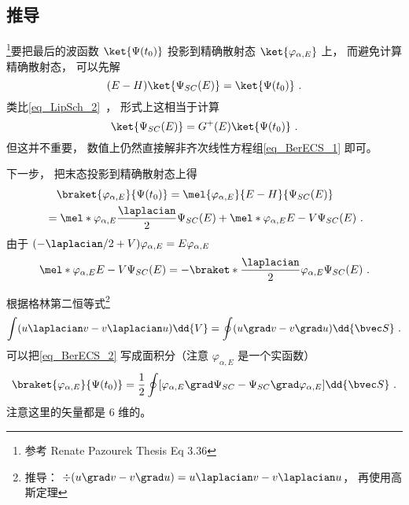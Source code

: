 
\begin{issues}
\issueDraft
\end{issues}


\subsection{推导}
\footnote{参考 Renate Pazourek Thesis Eq 3.36}要把最后的波函数 $\ket{\Psi(t_0)}$ 投影到精确散射态 $\ket{\varphi_{\alpha,E}}$ 上， 而避免计算精确散射态， 可以先解
\begin{equation}\label{eq_BerECS_1}
(E-H)\ket{\Psi_{SC}(E)} = \ket{\Psi(t_0)}~.
\end{equation}
类比\autoref{eq_LipSch_2}~， 形式上这相当于计算
\begin{equation}
\ket{\Psi_{SC}(E)} = G^+(E)\ket{\Psi(t_0)}~.
\end{equation}
但这并不重要， 数值上仍然直接解非齐次线性方程组\autoref{eq_BerECS_1} 即可。

下一步， 把末态投影到精确散射态上得
\begin{equation}\label{eq_BerECS_2}
\begin{aligned}
&\quad \braket{\varphi_{\alpha,E}}{\Psi(t_0)} = \mel{\varphi_{\alpha,E}}{E-H}{\Psi_{SC}(E)}\\
&= \mel*{\varphi_{\alpha,E}}{\frac{\laplacian}{2}}{\Psi_{SC}(E)} + \mel*{\varphi_{\alpha,E}}{E-V}{\Psi_{SC}(E)}~.
\end{aligned}
\end{equation}
由于 $(-\laplacian/2+V)\varphi_{\alpha,E} = E\varphi_{\alpha,E}$
\begin{equation}
\mel*{\varphi_{\alpha,E}}{E-V}{\Psi_{SC}(E)} = -\braket*{\frac{\laplacian}{2} \varphi_{\alpha,E}}{\Psi_{SC}(E)}~.
\end{equation}


根据格林第二恒等式\footnote{推导： $\div(u\grad v - v\grad u) = u\laplacian v - v\laplacian u$， 再使用高斯定理}
\begin{equation}
\int (u\laplacian v - v\laplacian u)\dd{V} = \oint (u\grad v - v\grad u) \dd{\bvec S}~.
\end{equation}
可以把\autoref{eq_BerECS_2} 写成面积分（注意 $\varphi_{\alpha,E}$ 是一个实函数）
\begin{equation}\label{eq_BerECS_3}
\braket{\varphi_{\alpha,E}}{\Psi(t_0)} = \frac{1}{2} \oint [\varphi_{\alpha,E} \grad \Psi_{SC} - \Psi_{SC} \grad \varphi_{\alpha,E}] \dd{\bvec S}~.
\end{equation}
注意这里的矢量都是 6 维的。

